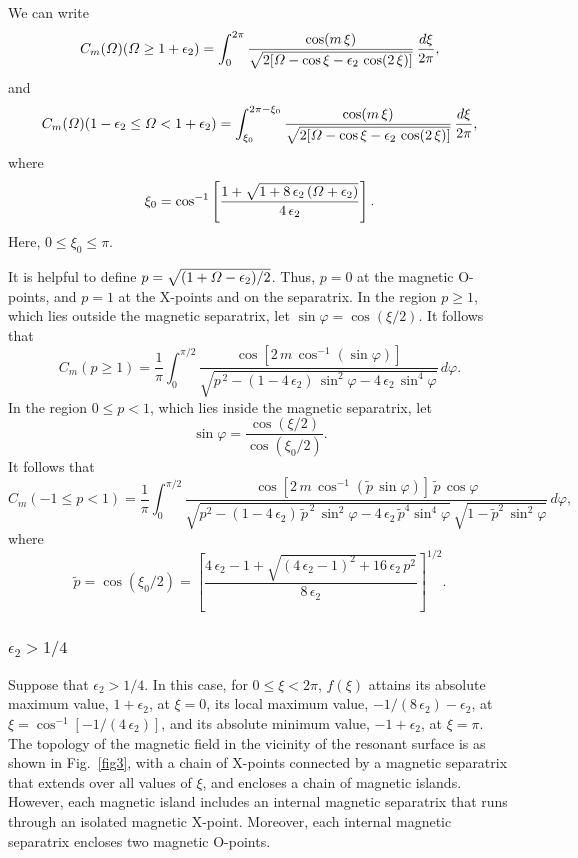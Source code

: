 \documentclass[12pt,prb,aps]{revtex4-1}
\begin{document}
We can write 
\begin{equation}
C_m({\mit\Omega})({\mit\Omega}\geq 1+\epsilon_2) = \int_0^{2\pi}
\frac{\cos(m\,\xi)}{\sqrt{2[{\mit\Omega}-\cos\xi-\epsilon_2\,\cos(2\,\xi)]}}\,\frac{d\xi}{2\pi},
\end{equation} 
and
\begin{equation}
C_m({\mit\Omega})(1-\epsilon_2\leq {\mit\Omega}< 1+\epsilon_2) = \int_{\xi_0}^{2\pi-\xi_0}
\frac{\cos(m\,\xi)}{\sqrt{2[{\mit\Omega}-\cos\xi-\epsilon_2\,\cos(2\,\xi)]}}\,\frac{d\xi}{2\pi},
\end{equation} 
where
\begin{equation}
\xi_0 =\cos^{-1}\left[\frac{1+\sqrt{1+8\,\epsilon_2\,({\mit\Omega}+\epsilon_2)}}{4\,\epsilon_2}\right].
\end{equation}
Here, $0\leq \xi_0\leq \pi$. 

It is helpful to define $p=\sqrt{(1+{\mit\Omega}-\epsilon_2)/2}$.  Thus, $p=0$ at the magnetic O-points, and $p=1$ at the
X-points and on the separatrix. In the region $p\geq1$, which lies outside the magnetic separatrix, let $\sin\varphi = \cos(\xi/2)$. 
It follows that 
\begin{equation}
 C_m(p\geq 1)=\frac{1}{\pi} \int_{0}^{\pi/2}\frac{\cos[2\,m\,\cos^{-1}(\sin\varphi)]}
 {\sqrt{p^{\,2}-(1-4\,\epsilon_2)\,\sin^2\varphi-4\,\epsilon_2\,\sin^4\varphi}}\,d\varphi.
\end{equation}
In the region $0\leq p< 1$, which lies inside the magnetic separatrix, let 
\begin{equation}
\sin\varphi = \frac{\cos(\xi/2)}{\cos(\xi_0/2)}.
\end{equation}
 It follows that 
\begin{equation}
 C_m(-1\leq p< 1)=\frac{1}{\pi} \int_{0}^{\pi/2}\frac{\cos[2\,m\,\cos^{-1}(\tilde{p}\,\sin\varphi)]\,\tilde{p}\,\cos\varphi}
 {\sqrt{p^2-(1-4\,\epsilon_2)\,\tilde{p}^{\,2}\,\sin^2\varphi-4\,\epsilon_2\,\tilde{p}^4\sin^4\varphi}\,\sqrt{1-\tilde{p}^2\,\sin^2\varphi}}\,d\varphi,
\end{equation}
where
\begin{equation}
\tilde{p}= \cos(\xi_0/2) = \left[\frac{4\,\epsilon_2-1+\sqrt{(4\,\epsilon_2-1)^2+16\,\epsilon_2\,p^2}}{8\,\epsilon_2}\right]^{1/2}.
\end{equation}

\subsubsection{$\epsilon_2 > 1/4$}
Suppose that $\epsilon_2> 1/4$. In this case, for $0\leq \xi< 2\pi$, $f(\xi)$ attains its absolute maximum value, $1+\epsilon_2$, at $\xi=0$, its local maximum value, $-1/(8\,\epsilon_2)-\epsilon_2$, at $\xi=\cos^{-1}[-1/(4\,\epsilon_2)]$,
and its absolute minimum value, $-1+\epsilon_2$, at $\xi=\pi$.    The topology of the magnetic field 
in the vicinity of the resonant surface is as shown in Fig.~\ref{fig3}, with  a chain of X-points connected by a
magnetic separatrix that extends over all values of $\xi$, and encloses a chain of magnetic islands. However,
each magnetic island includes an internal magnetic separatrix that runs through an isolated magnetic
X-point. Moreover, each internal magnetic separatrix encloses two magnetic O-points. 
\end{document}
